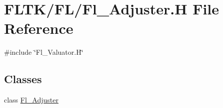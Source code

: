 \hypertarget{_fl___adjuster_8_h}{}\section{F\+L\+T\+K/\+F\+L/\+Fl\+\_\+\+Adjuster.H File Reference}
\label{_fl___adjuster_8_h}
{\ttfamily \#include \char`\"{}Fl\+\_\+\+Valuator.\+H\char`\"{}}\newline
\subsection*{Classes}
\begin{DoxyCompactItemize}
\item 
class \hyperlink{class_fl___adjuster}{Fl\+\_\+\+Adjuster}
\end{DoxyCompactItemize}
